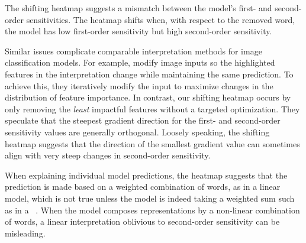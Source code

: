 The shifting heatmap suggests a mismatch between the model's first- and
second-order sensitivities. The heatmap shifts when, with respect to the removed
word, the model has low first-order sensitivity but high second-order
sensitivity.

Similar issues complicate comparable interpretation methods for image
classification models. For example, \citet{ghorbani2017interpretation}
modify image inputs so the highlighted features in the interpretation
change while maintaining the same prediction. To achieve this, they
iteratively modify the input to maximize changes in the distribution
of feature importance.  In contrast, our shifting heatmap occurs by
only removing the \emph{least} impactful features without a targeted
optimization.  They speculate that the steepest gradient direction for
the first- and second-order sensitivity values are generally
orthogonal. Loosely speaking, the shifting heatmap suggests that the
direction of the smallest gradient value can sometimes align with very
steep changes in second-order sensitivity.

When explaining individual model predictions, the heatmap
suggests that the prediction is made based on a weighted combination of words, as
in a linear model, which is not true unless the model is indeed taking a
weighted sum such as in a ~\cite{iyyer2015deep}. When the model
composes representations by a non-linear combination of words, a linear
interpretation oblivious to second-order sensitivity can be misleading.
